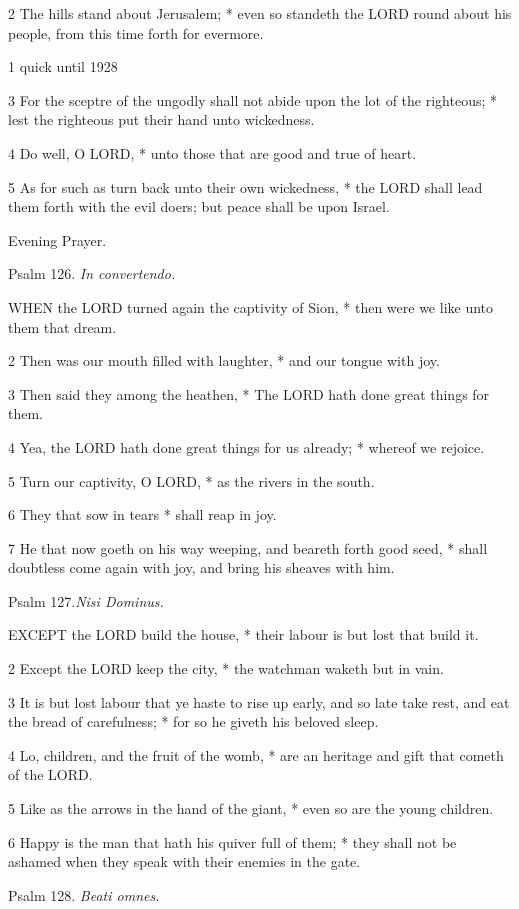 2 The hills stand about Jerusalem; * even so standeth
the LORD round about his people, from this time forth for evermore.

1 quick until
1928

3 For
the sceptre of the ungodly shall not abide upon the lot of the righteous;
* lest the righteous put their hand unto wickedness.

4 Do well, O LORD, * unto those that are good and true
of heart.

5 As for such as turn back unto their own wickedness,
* the LORD shall lead them forth with the evil doers; but peace shall
be upon Israel. 

Evening
Prayer.

Psalm
126. \emph{In convertendo.}

WHEN
the LORD turned again the captivity of Sion, * then were we like unto
them that dream.

2 Then was our mouth filled with laughter, * and our
tongue with joy.

3 Then said they among the heathen, * The LORD hath
done great things for them.

4 Yea, the LORD hath done great things for us already;
* whereof we rejoice.

5 Turn our captivity, O LORD, * as the rivers in the
south.

6 They that sow in tears * shall reap in joy.

7 He that now goeth on his way weeping, and beareth
forth good seed, * shall doubtless come again with joy, and bring his
sheaves with him.

Psalm
127.\emph{Nisi Dominus.}

EXCEPT
the LORD build the house, * their labour is but lost that build it.

2 Except the LORD keep the city, * the watchman waketh
but in vain.

3 It is but lost labour that ye haste to rise up early,
and so late take rest, and eat the bread of carefulness; * for so he giveth
his beloved sleep.

4 Lo, children, and the fruit of the womb, * are an
heritage and gift that cometh of the LORD.

5 Like as the arrows in the hand of the giant, * even
so are the young children.

6 Happy is the man that hath his quiver full of them;
* they shall not be ashamed when they speak with their enemies in the
gate.

Psalm
128. \emph{Beati omnes.}

